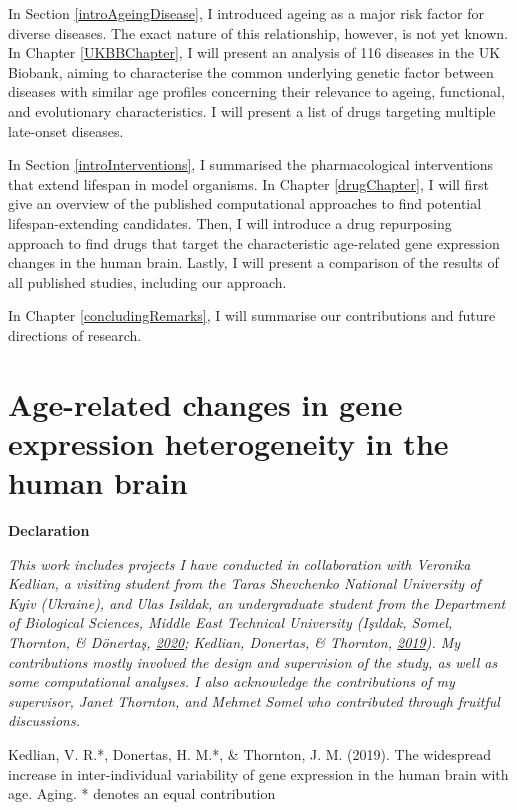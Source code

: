 \documentclass[12pt,twoside]{unicam}
\begin{document}
In Section \ref{introAgeingDisease}, I introduced ageing as a major risk factor for diverse diseases. The exact nature of this relationship, however, is not yet known. In Chapter \ref{UKBBChapter}, I will present an analysis of 116 diseases in the UK Biobank, aiming to characterise the common underlying genetic factor between diseases with similar age profiles concerning their relevance to ageing, functional, and evolutionary characteristics. I will present a list of drugs targeting multiple late-onset diseases.

In Section \ref{introInterventions}, I summarised the pharmacological interventions that extend lifespan in model organisms. In Chapter \ref{drugChapter}, I will first give an overview of the published computational approaches to find potential lifespan-extending candidates. Then, I will introduce a drug repurposing approach to find drugs that target the characteristic age-related gene expression changes in the human brain. Lastly, I will present a comparison of the results of all published studies, including our approach.

In Chapter \ref{concludingRemarks}, I will summarise our contributions and future directions of research.

\hypertarget{HeterogeneityChapter}{%
\chapter{Age-related changes in gene expression heterogeneity in the human brain}\label{HeterogeneityChapter}}

\small

\textbf{Declaration}

\emph{This work includes projects I have conducted in collaboration with Veronika Kedlian, a visiting student from the Taras Shevchenko National University of Kyiv (Ukraine), and Ulas Isildak, an undergraduate student from the Department of Biological Sciences, Middle East Technical University (Işıldak, Somel, Thornton, \& Dönertaş, \protect\hyperlink{ref-Isildak2020}{2020}; Kedlian, Donertas, \& Thornton, \protect\hyperlink{ref-Kedlian2019}{2019}). My contributions mostly involved the design and supervision of the study, as well as some computational analyses. I also acknowledge the contributions of my supervisor, Janet Thornton, and Mehmet Somel who contributed through fruitful discussions.}

Kedlian, V. R.*, Donertas, H. M.*, \& Thornton, J. M. (2019). The widespread increase in inter-individual variability of gene expression in the human brain with age. Aging.
* denotes an equal contribution
\end{document}
